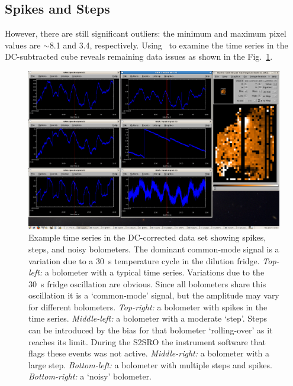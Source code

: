 \documentclass[twoside,11pt]{starlink}
\providecommand{\about}{$\sim$}
\providecommand{\gaia}{\xref{\textsc{Gaia}}{sun214}{}}
\begin{document}
\subsection{Spikes and Steps}
\label{sec:spikesteps}

However, there are still significant outliers: the minimum and maximum
pixel values are \about8.1 and 3.4, respectively. Using \gaia\ to examine
the time series in the DC-subtracted cube reveals remaining data issues as
shown in the Fig.~\ref{fig:timeseries}.

\begin{figure}[ht]
\begin{center}
\includegraphics[width=1.0\linewidth]{sc19_timeseries}
\caption{Example time series in the DC-corrected data set showing
spikes, steps, and noisy bolometers. The dominant common-mode signal is
a variation due to a 30~s temperature cycle in the dilution fridge.
\textsl{Top-left:} a bolometer with a typical time
series. Variations due to the 30~s fridge oscillation are
obvious. Since all bolometers share this oscillation it is a
`common-mode' signal, but the amplitude may vary for different
bolometers.
\textsl{Top-right:} a bolometer with spikes in the time
series. \textsl{Middle-left:} a bolometer with a moderate `step'. Steps
can be introduced by the bias for that bolometer `rolling-over' as it
reaches its limit. During the S2SRO the instrument software that flags
these events was not active.
\textsl{Middle-right:} a bolometer with a large step.
\textsl{Bottom-left:} a bolometer with multiple steps and
spikes.
\textsl{Bottom-right:} a `noisy' bolometer. }
\label{fig:timeseries}
\end{center}
\end{figure}
\end{document}

